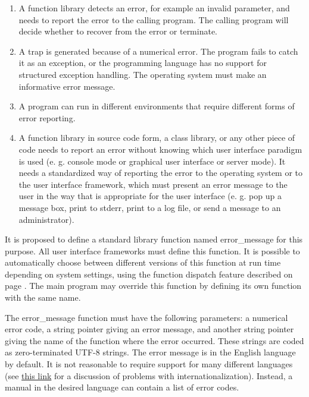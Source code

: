 \documentclass[forwardcom.tex]{subfiles}
\begin{document}
\begin{enumerate}
\item A function library detects an error, for example an invalid parameter, and needs to report the error to the calling program. The calling program will decide whether to recover from the error or terminate. 

\item A trap is generated because of a numerical error. The program fails to catch it as an exception, or the programming language has no support for structured exception handling. The operating system must make an informative error message. 

\item A program can run in different environments that require different forms of error reporting. 

\item A function library in source code form, a class library, or any other piece of code needs to report an error without knowing which user interface paradigm is used (e. g. console mode or graphical user interface or server mode). It needs a standardized way of reporting the error to the operating system or to the user interface framework, which must present an error 
message to the user in the way that is appropriate for the user interface (e. g. pop up a message box, print to stderr, print to a log file, or send a message to an administrator).
\end{enumerate}

\label{errorReportFunction}
It is proposed to define a standard library function named error\_message for this purpose. All user interface frameworks must define this function. It is possible to automatically choose between different versions of this function at run time depending on system settings, using the function dispatch feature described on page \pageref{libraryFunctionDispatchSystem}. The main program may override this function by defining its own function with the same name. 
\vspace{2mm}

The error\_message function must have the following parameters: a numerical error code, a string pointer giving an error message, and another string pointer giving the name of the function where the error occurred. These strings are coded as zero-terminated UTF-8 strings. 
The error message is in the English language by default. It is not reasonable to require support for many different languages (see 
\href{https://en.wikibooks.org/wiki/Usability_for_Nerds/Software/Internationalization}{this link} for a discussion of problems with internationalization). Instead, a manual in the desired language can contain a list of error codes. 
\vspace{2mm}
\end{document}
